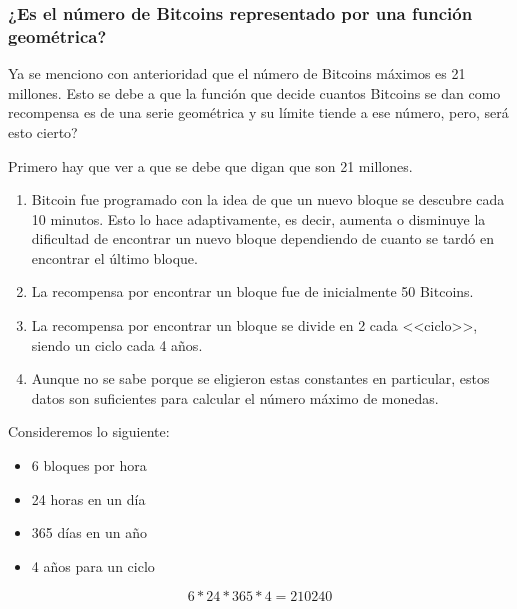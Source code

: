 \documentclass[12pt,letterpaper]{article}
\begin{document}
    \subsubsection*{¿Es el número de Bitcoins representado por una función geom\'etrica?}

    Ya se menciono con anterioridad que el n\'umero de Bitcoins m\'aximos es 21 millones. Esto se debe a que la funci\'on que decide cuantos Bitcoins se dan como recompensa es de una serie geom\'etrica y su l\'imite tiende a ese n\'umero, pero, ser\'a esto cierto? 

    Primero hay que ver a que se debe que digan que son 21 millones.
    \\

    \begin{enumerate}

        \item Bitcoin fue programado con la idea de que un nuevo bloque se descubre cada 10 minutos. Esto lo hace adaptivamente, es decir, aumenta o disminuye la dificultad de encontrar un nuevo bloque dependiendo de cuanto se tard\'o en encontrar el \'ultimo bloque.

        \item La recompensa por encontrar un bloque fue de inicialmente 50 Bitcoins.
            
        \item La recompensa por encontrar un bloque se divide en 2 cada <<ciclo>>, siendo un ciclo cada 4 a\~nos.

        \item Aunque no se sabe porque se eligieron estas constantes en particular, estos datos son suficientes para calcular el n\'umero m\'aximo de monedas.

    \end{enumerate}


    Consideremos lo siguiente: 
    \begin{itemize}
        \item 6 bloques por hora 

        \item 24 horas en un d\'ia

        \item 365 d\'ias en un a\~no

        \item4 a\~nos para un ciclo

    \end{itemize}

    $$6 * 24 * 365 * 4 = 210240$$
\end{document}

